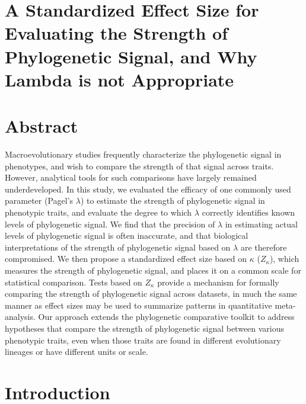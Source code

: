 \documentclass[
]{article}
\author{}
\date{\vspace{-2.5em}}
\begin{document}
\hypertarget{a-standardized-effect-size-for-evaluating-the-strength-of-phylogenetic-signal-and-why-lambda-is-not-appropriate}{%
\section{A Standardized Effect Size for Evaluating the Strength of
Phylogenetic Signal, and Why Lambda is not
Appropriate}\label{a-standardized-effect-size-for-evaluating-the-strength-of-phylogenetic-signal-and-why-lambda-is-not-appropriate}}

\hfill\break

\hypertarget{abstract}{%
\section{Abstract}\label{abstract}}

Macroevolutionary studies frequently characterize the phylogenetic
signal in phenotypes, and wish to compare the strength of that signal
across traits. However, analytical tools for such comparisons have
largely remained underdeveloped. In this study, we evaluated the
efficacy of one commonly used parameter (Pagel's \(\lambda\)) to
estimate the strength of phylogenetic signal in phenotypic traits, and
evaluate the degree to which \(\lambda\) correctly identifies known
levels of phylogenetic signal. We find that the precision of \(\lambda\)
in estimating actual levels of phylogenetic signal is often inaccurate,
and that biological interpretations of the strength of phylogenetic
signal based on \(\lambda\) are therefore compromised. We then propose a
standardized effect size based on \(\kappa\) (\(Z_\kappa\)), which
measures the strength of phylogenetic signal, and places it on a common
scale for statistical comparison. Tests based on \(Z_\kappa\) provide a
mechanism for formally comparing the strength of phylogenetic signal
across datasets, in much the same manner as effect sizes may be used to
summarize patterns in quantitative meta-analysis. Our approach extends
the phylogenetic comparative toolkit to address hypotheses that compare
the strength of phylogenetic signal between various phenotypic traits,
even when those traits are found in different evolutionary lineages or
have different units or scale.

\newpage

\hypertarget{introduction}{%
\section{Introduction}\label{introduction}}
\end{document}
